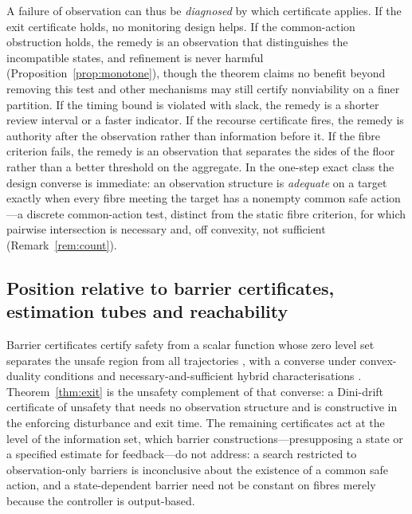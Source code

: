 \documentclass[11pt,a4paper]{article}
\theoremstyle{plain}
\theoremstyle{definition}
\theoremstyle{remark}
\begin{document}
A failure of observation can thus be \emph{diagnosed} by which certificate applies. If the exit certificate holds, no monitoring design helps. If the common-action obstruction holds, the remedy is an observation that distinguishes the incompatible states, and refinement is never harmful (Proposition~\ref{prop:monotone}), though the theorem claims no benefit beyond removing this test and other mechanisms may still certify nonviability on a finer partition. If the timing bound is violated with slack, the remedy is a shorter review interval or a faster indicator. If the recourse certificate fires, the remedy is authority after the observation rather than information before it. If the fibre criterion fails, the remedy is an observation that separates the sides of the floor rather than a better threshold on the aggregate. In the one-step exact class the design converse is immediate: an observation structure is \emph{adequate} on a target exactly when every fibre meeting the target has a nonempty common safe action---a discrete common-action test, distinct from the static fibre criterion, for which pairwise intersection is necessary and, off convexity, not sufficient (Remark~\ref{rem:count}).

\subsection{Position relative to barrier certificates, estimation tubes and reachability}\label{sec:position}

Barrier certificates certify safety from a scalar function whose zero level set separates the unsafe region from all trajectories \citep{prajna2004,prajna2007}, with a converse under convex-duality conditions \citep{prajna2005} and necessary-and-sufficient hybrid characterisations \citep{maghenem2019}. Theorem~\ref{thm:exit} is the unsafety complement of that converse: a Dini-drift certificate of unsafety that needs no observation structure and is constructive in the enforcing disturbance and exit time. The remaining certificates act at the level of the information set, which barrier constructions---presupposing a state or a specified estimate for feedback---do not address: a search restricted to observation-only barriers is inconclusive about the existence of a common safe action, and a state-dependent barrier need not be constant on fibres merely because the controller is output-based.
\end{document}
